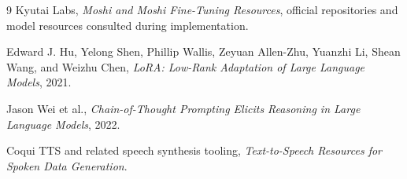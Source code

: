 \documentclass[12pt,a4paper]{article}
\begin{document}
\begin{thebibliography}{9}
Kyutai Labs,
\textit{Moshi and Moshi Fine-Tuning Resources},
official repositories and model resources consulted during implementation.

Edward J. Hu, Yelong Shen, Phillip Wallis, Zeyuan Allen-Zhu, Yuanzhi Li, Shean Wang, and Weizhu Chen,
\textit{LoRA: Low-Rank Adaptation of Large Language Models},
2021.

Jason Wei et al.,
\textit{Chain-of-Thought Prompting Elicits Reasoning in Large Language Models},
2022.

Coqui TTS and related speech synthesis tooling,
\textit{Text-to-Speech Resources for Spoken Data Generation}.
\end{thebibliography}
\end{document}
